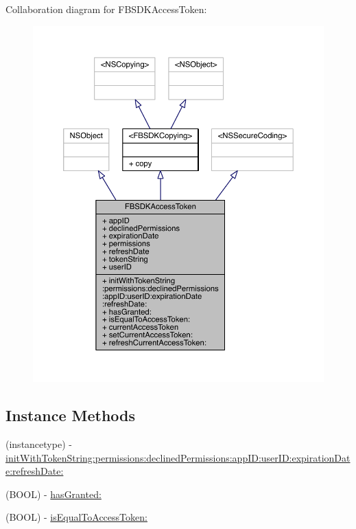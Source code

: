 Collaboration diagram for F\-B\-S\-D\-K\-Access\-Token\-:
\nopagebreak
\begin{figure}[H]
\begin{center}
\leavevmode
\includegraphics[width=350pt]{interface_f_b_s_d_k_access_token__coll__graph}
\end{center}
\end{figure}
\subsection*{Instance Methods}
\begin{DoxyCompactItemize}
\item 
(instancetype) -\/ \hyperlink{interface_f_b_s_d_k_access_token_ab498348bc81a7f9735316386a4e3f497}{init\-With\-Token\-String\-:permissions\-:declined\-Permissions\-:app\-I\-D\-:user\-I\-D\-:expiration\-Date\-:refresh\-Date\-:}
\item 
(B\-O\-O\-L) -\/ \hyperlink{interface_f_b_s_d_k_access_token_a5cb28a32a0b0598feaa4695e14751898}{has\-Granted\-:}
\item 
(B\-O\-O\-L) -\/ \hyperlink{interface_f_b_s_d_k_access_token_a08f16c50056958fc749ad372f74c0063}{is\-Equal\-To\-Access\-Token\-:}
\end{DoxyCompactItemize}
